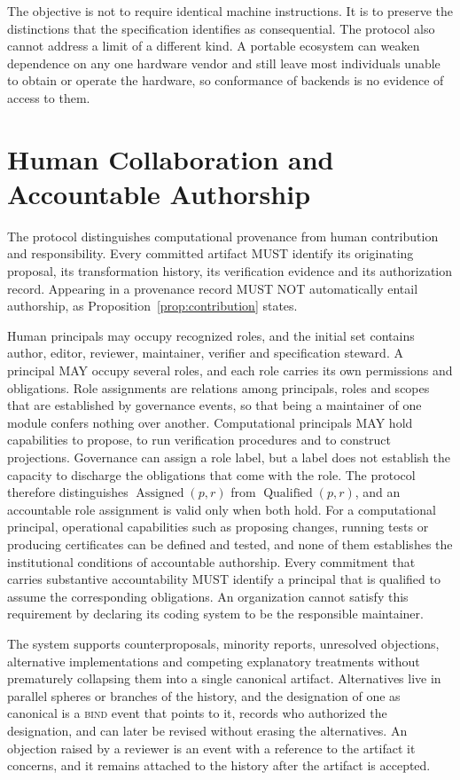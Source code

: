 \documentclass[11pt]{article}
\theoremstyle{remark}
\newcommand{\BIND}{\textsc{bind}}
\begin{document}
The objective is not to require identical machine instructions. It is to preserve the distinctions that the specification identifies as consequential. The protocol also cannot address a limit of a different kind. A portable ecosystem can weaken dependence on any one hardware vendor and still leave most individuals unable to obtain or operate the hardware, so conformance of backends is no evidence of access to them.

\section{Human Collaboration and Accountable Authorship}\label{sec:human}

The protocol distinguishes computational provenance from human contribution and responsibility. Every committed artifact MUST identify its originating proposal, its transformation history, its verification evidence and its authorization record. Appearing in a provenance record MUST NOT automatically entail authorship, as Proposition~\ref{prop:contribution} states.

Human principals may occupy recognized roles, and the initial set contains author, editor, reviewer, maintainer, verifier and specification steward. A principal MAY occupy several roles, and each role carries its own permissions and obligations. Role assignments are relations among principals, roles and scopes that are established by governance events, so that being a maintainer of one module confers nothing over another. Computational principals MAY hold capabilities to propose, to run verification procedures and to construct projections. Governance can assign a role label, but a label does not establish the capacity to discharge the obligations that come with the role. The protocol therefore distinguishes $\operatorname{Assigned}(p,r)$ from $\operatorname{Qualified}(p,r)$, and an accountable role assignment is valid only when both hold. For a computational principal, operational capabilities such as proposing changes, running tests or producing certificates can be defined and tested, and none of them establishes the institutional conditions of accountable authorship. Every commitment that carries substantive accountability MUST identify a principal that is qualified to assume the corresponding obligations. An organization cannot satisfy this requirement by declaring its coding system to be the responsible maintainer.

The system supports counterproposals, minority reports, unresolved objections, alternative implementations and competing explanatory treatments without prematurely collapsing them into a single canonical artifact. Alternatives live in parallel spheres or branches of the history, and the designation of one as canonical is a \BIND{} event that points to it, records who authorized the designation, and can later be revised without erasing the alternatives. An objection raised by a reviewer is an event with a reference to the artifact it concerns, and it remains attached to the history after the artifact is accepted.
\end{document}
